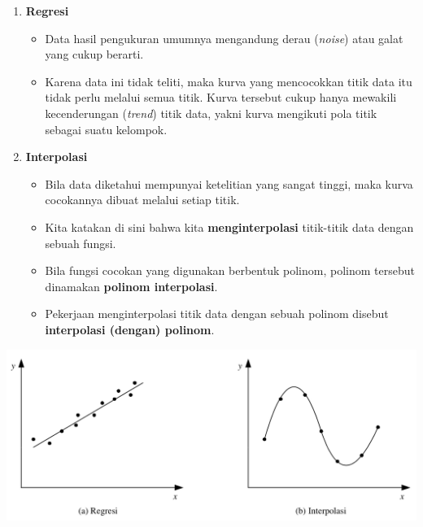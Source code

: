 \documentclass[pdflatex,compress,mathserif]{beamer}
\begin{document}
\begin{frame}
	\begin{enumerate}
		\item \textbf{Regresi}
		\begin{itemize}
			\item Data hasil pengukuran umumnya mengandung derau (\textit{noise}) atau galat yang cukup berarti.
			\item Karena data ini tidak teliti, maka kurva yang mencocokkan titik data itu tidak perlu melalui semua titik.
			Kurva tersebut cukup hanya mewakili kecenderungan (\textit{trend}) titik data, yakni kurva mengikuti pola titik sebagai suatu kelompok.
		\end{itemize}
	\end{enumerate}
\end{frame}

\begin{frame}
	\begin{enumerate}
		\setcounter{enumi}{1}
		\item \textbf{Interpolasi}
		\begin{itemize}
			\item Bila data diketahui mempunyai ketelitian yang sangat tinggi, maka kurva cocokannya dibuat melalui setiap titik.
			\item Kita katakan di sini bahwa kita \textbf{menginterpolasi} titik-titik data dengan sebuah fungsi.
			\item Bila fungsi cocokan yang digunakan berbentuk polinom, polinom tersebut dinamakan \textbf{polinom interpolasi}.
			\item Pekerjaan menginterpolasi titik data dengan sebuah polinom disebut \textbf{interpolasi (dengan) polinom}.
		\end{itemize}
	\end{enumerate}
\end{frame}

\begin{frame}
	\begin{center}
		\includegraphics[width=\linewidth]{img/img02}
	\end{center}
\end{frame}
\end{document}
